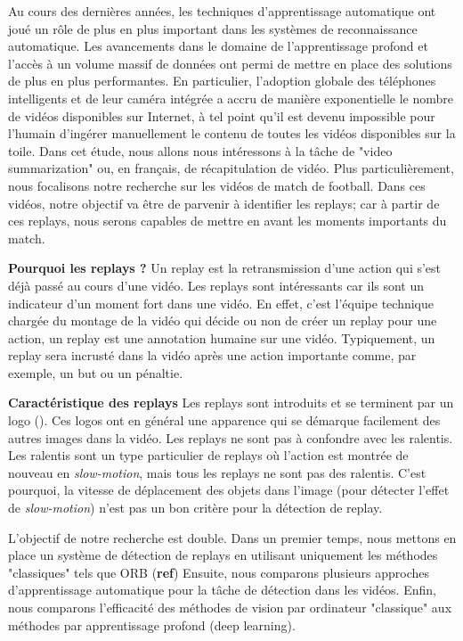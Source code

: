 \documentclass[11pt]{article}
\begin{document}
Au cours des dernières années, les techniques d'apprentissage automatique ont joué un rôle de plus en plus important dans les systèmes de reconnaissance automatique.
Les avancements dans le domaine de l'apprentissage profond et l'accès à un volume massif de données ont permi de mettre en place des solutions de plus en plus performantes.
En particulier, l'adoption globale des téléphones intelligents et de leur caméra intégrée a accru de manière exponentielle le nombre de vidéos disponibles sur Internet, à tel point qu'il est devenu impossible pour l'humain d'ingérer manuellement le contenu de toutes les vidéos disponibles sur la toile.
Dans cet étude, nous allons nous intéressons à la tâche de "video summarization" ou, en français, de récapitulation de vidéo.
Plus particulièrement, nous focalisons notre recherche sur les vidéos de match de football.
Dans ces vidéos, notre objectif va être de parvenir à identifier les replays; car à partir de ces replays, nous serons capables de mettre en avant les moments importants du match.

\textbf{Pourquoi les replays ?} Un replay est la retransmission d'une action qui s'est déjà passé au cours d'une vidéo.
Les replays sont intéressants car ils sont un indicateur d'un moment fort dans une vidéo.
En effet, c'est l'équipe technique chargée du montage de la vidéo qui décide ou non de créer un replay pour une action, un replay est une annotation humaine sur une vidéo.
Typiquement, un replay sera incrusté dans la vidéo après une action importante comme, par exemple, un but ou un pénaltie.

\textbf{Caractéristique des replays} Les replays sont introduits et se terminent par un logo (\cite{Hao_Pan_2002}).
Ces logos ont en général une apparence qui se démarque facilement des autres images dans la vidéo.
Les replays ne sont pas à confondre avec les ralentis.
Les ralentis sont un type particulier de replays où l'action est montrée de nouveau en \emph{slow-motion}, mais tous les replays ne sont pas des ralentis.
C'est pourquoi, la vitesse de déplacement des objets dans l'image (pour détecter l'effet de \emph{slow-motion}) n'est pas un bon critère pour la détection de replay.

L'objectif de notre recherche est double.
Dans un premier temps, nous mettons en place un système de détection de replays en utilisant uniquement les méthodes "classiques" tels que ORB (\textbf{ref})
Ensuite, nous comparons plusieurs approches d'apprentissage automatique pour la tâche de détection dans les vidéos.
Enfin, nous comparons l'efficacité des méthodes de vision par ordinateur "classique" aux méthodes par apprentissage profond (deep learning).
\end{document}
